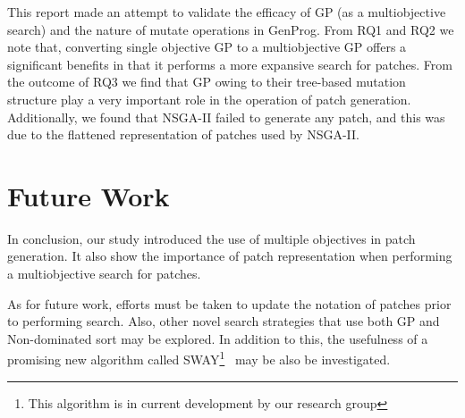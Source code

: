 \documentclass{sig-alternate}
\theoremstyle{break}
\begin{document}
This report made an attempt to validate the efficacy of GP (as a multiobjective search) and the nature of mutate operations in GenProg. From RQ1 and RQ2 we note that, converting single objective GP to a multiobjective GP offers a significant benefits in that it performs a more expansive search for patches. From the outcome of RQ3 we find that GP owing to their tree-based mutation structure play a very important role in the operation of patch generation. Additionally, we found that NSGA-II failed to generate any patch, and this was due to the flattened representation of patches used by NSGA-II.     

\section{Future Work}
\label{conclusions}
In conclusion, our study introduced the use of multiple objectives in patch generation. It also show the importance of patch representation when performing a multiobjective search for patches.

As for future work, efforts must be taken to update the notation of patches prior to performing search. Also, other novel search strategies that use both GP and Non-dominated sort may be explored. In addition to this, the usefulness of a promising new algorithm called SWAY\footnote{This algorithm is in current development by our research group}~\cite{chen2016sampling, nair2016accidental} may be also be investigated.
\balance


\end{document}
